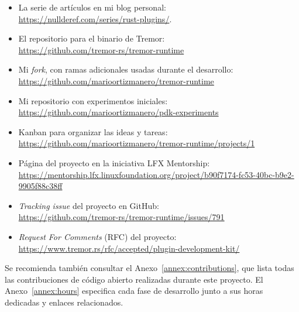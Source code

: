 \begin{itemize}
    \item La serie de artículos en mi blog personal:\\
        \url{https://nullderef.com/series/rust-plugins/}.

    \item El repositorio para el binario de Tremor:\\
        \url{https://github.com/tremor-rs/tremor-runtime}

    \item Mi \emph{fork}, con ramas adicionales usadas durante el desarrollo:\\
        \url{https://github.com/marioortizmanero/tremor-runtime}

    \item Mi repositorio con experimentos iniciales:\\
        \url{https://github.com/marioortizmanero/pdk-experiments}

    \item Kanban para organizar las ideas y tareas:\\
        \url{https://github.com/marioortizmanero/tremor-runtime/projects/1}

    \item Página del proyecto en la iniciativa LFX Mentorship:\\
        \url{https://mentorship.lfx.linuxfoundation.org/project/b90f7174-fc53-40bc-b9e2-9905f88c38ff}

    \item \emph{Tracking issue} del proyecto en GitHub:\\
        \url{https://github.com/tremor-rs/tremor-runtime/issues/791}

    \item \emph{Request For Comments} (RFC) del proyecto:\\
        \url{https://www.tremor.rs/rfc/accepted/plugin-development-kit/}

\end{itemize}

Se recomienda también consultar el Anexo~\ref{annex:contributions}, que lista
todas las contribuciones de código abierto realizadas durante este proyecto. El
Anexo~\ref{annex:hours} especifica cada fase de desarrollo junto a sus horas
dedicadas y enlaces relacionados.

